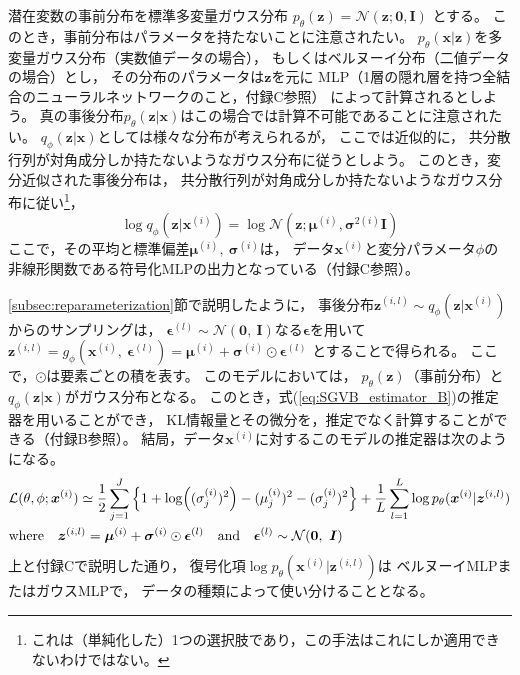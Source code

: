 \documentclass[dvipdfmx, fleqn, draft]{jsarticle}
\begin{document}
潜在変数の事前分布を標準多変量ガウス分布
\(p_{\theta} (\bm{z}) = \mathcal{N}(\bm{z}; \bm{0}, \bm{I})\)
とする。
このとき，事前分布はパラメータを持たないことに注意されたい。
\(p_{\theta} (\bm{x} | \bm{z})\)を多変量ガウス分布（実数値データの場合），
もしくはベルヌーイ分布（二値データの場合）とし，
その分布のパラメータは\(\bm{z}\)を元に
MLP（1層の隠れ層を持つ全結合のニューラルネットワークのこと，付録C参照）
によって計算されるとしよう。
真の事後分布\(p_{\theta} (\bm{z} | \bm{x})\)はこの場合では計算不可能であることに注意されたい。
\(q_{\phi} (\bm{z} | \bm{x})\)としては様々な分布が考えられるが，
ここでは近似的に，
共分散行列が対角成分しか持たないようなガウス分布に従うとしよう。
このとき，変分近似された事後分布は，
共分散行列が対角成分しか持たないようなガウス分布に従い\footnote{これは（単純化した）1つの選択肢であり，この手法はこれにしか適用できないわけではない。}，
\begin{equation}
    \log{q_{\phi} (\bm{z} | \bm{x}^{(i)})} = \log{\mathcal{N} (\bm{z}; \bm{\mu}^{(i)}, \bm{\sigma}^{2(i)} \bm{I})}
\end{equation}
ここで，その平均と標準偏差\(\bm{\mu}^{(i)},\ \bm{\sigma}^{(i)}\)は，
データ\(\bm{x}^{(i)}\)と変分パラメータ\(\phi\)の非線形関数である符号化MLPの出力となっている（付録C参照）。

\ref{subsec:reparameterization}節で説明したように，
事後分布\(\bm{z}^{(i, l)} \sim q_{\phi} (\bm{z} | \bm{x}^{(i)}) \)からのサンプリングは，
\(\bm{\epsilon}^{(l)} \sim \mathcal{N}(\bm{0},\ \bm{I})\)なる\(\bm{\epsilon}\)を用いて
\(\bm{z}^{(i, l)} = g_{\phi} (\bm{x}^{(i)},\ \bm{\epsilon}^{(l)}) = \bm{\mu}^{(i)} + \bm{\sigma}^{(i)} \odot \bm{\epsilon}^{(l)}\)
とすることで得られる。
ここで，\(\odot\)は要素ごとの積を表す。
このモデルにおいては，
\(p_{\theta} (\bm{z})\)（事前分布）と\(q_{\phi} (\bm{z} | \bm{x})\)がガウス分布となる。
このとき，式(\ref{eq:SGVB_estimator_B})の推定器を用いることができ，
KL情報量とその微分を，推定でなく計算することができる（付録B参照）。
結局，データ\(\bm{x}^{(i)}\)に対するこのモデルの推定器は次のようになる。
\begin{equation}
    \begin{split}
        & \mathcal{L}(\theta, \phi; \bm{x}^{(i)})
            \simeq \frac{1}{2} \sum_{j=1}^{J} \qty{1 + \log((\sigma_j^{(i)})^2) - (\mu_j^{(i)})^2 - (\sigma_j^{(i)})^2}
                + \frac{1}{L} \sum_{l=1}^{L} \log{p_{\theta} (\bm{x}^{(i)} | \bm{z}^{(i, l)})} \\
        & \text{where} \quad
            \bm{z}^{(i, l)} = \bm{\mu}^{(i)} + \bm{\sigma}^{(i)} \odot \bm{\epsilon}^{(l)}
            \quad \text{and} \quad
            \bm{\epsilon}^{(l)} \sim \mathcal{N}(\bm{0},\ \bm{I})
    \end{split}
    \label{eq:variational_lower_bound_Gauss}
\end{equation}
上と付録Cで説明した通り，
復号化項\(\log{p_{\theta} (\bm{x}^{(i)} | \bm{z}^{(i, l)})}\)は
ベルヌーイMLPまたはガウスMLPで，
データの種類によって使い分けることとなる。
\end{document}
